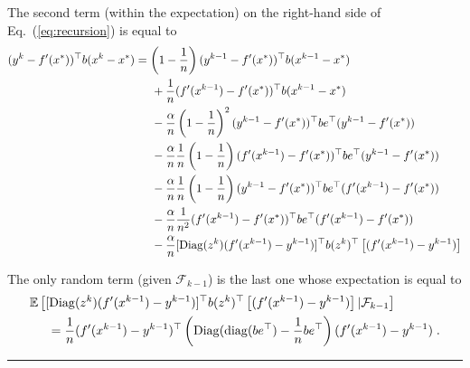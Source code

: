 \documentclass{article}
\newcommand{\diag}{\mathop{\rm diag}}
\newcommand{\Diag}{\mathop{\rm Diag}}
\newcommand{\BlackBox}{\rule{1.5ex}{1.5ex}}  %
\newenvironment{proof}{\par\noindent{\bf Proof\ }}{\hfill\BlackBox\\[2mm]}
\newcommand{\eq}[1]{Eq.~(\ref{eq:#1})}
\def\diag{\operatorname{diag}}
\def\E{_{\scriptscriptstyle E}}
\def \E{{\mathbb E}}
\def \E{{\mathbb E}}
\begin{document}
\begin{proof}
The second term (within the expectation) on the right-hand side of \eq{recursion} is equal to
\begin{align*}
(y^k - f'(x^\ast))^\top b (x^k - x^\ast) 	& = \left(1 - \frac{1}{n}\right)(y^{k-1} - f'(x^\ast))^\top b (x^{k-1} - x^\ast) \\
& \hspace*{.5cm} + \frac{1}{n}(f'(x^{k-1}) - f'(x^\ast))^\top b (x^{k-1} - x^\ast) \\
& \hspace*{.5cm} - \frac{\alpha}{n} \left(1 - \frac{1}{n}\right)^2(y^{k-1} - f'(x^\ast))^\top b e^\top (y^{k-1} - f'(x^\ast))\\
& \hspace*{.5cm} - \frac{\alpha}{n} \frac{1}{n} \left(1 - \frac{1}{n}\right)(f'(x^{k-1}) - f'(x^\ast))^\top b e^\top (y^{k-1} - f'(x^\ast))\\
& \hspace*{.5cm} - \frac{\alpha}{n} \frac{1}{n} \left(1 - \frac{1}{n}\right)(y^{k-1} - f'(x^\ast))^\top b e^\top (f'(x^{k-1}) - f'(x^\ast))\\
& \hspace*{.5cm} - \frac{\alpha}{n} \frac{1}{n^2} (f'(x^{k-1}) - f'(x^\ast))^\top b e^\top(f'(x^{k-1}) - f'(x^\ast))\\
& \hspace*{.5cm} - \frac{\alpha}{n} [\Diag(z^k) (f'(x^{k-1}) - y^{k-1})]^\top b (z^k)^\top \left[(f'(x^{k-1}) - y^{k-1})\right]
\end{align*}

The only random term (given $\mathcal{F}_{k-1}$) is the last one whose expectation is equal to
\begin{align*}
&\E\left[[\Diag(z^k) (f'(x^{k-1}) - y^{k-1})]^\top b (z^k)^\top \left[(f'(x^{k-1}) - y^{k-1})\right]| \mathcal{F}_{k-1}\right]\\
&\hspace*{.5cm} = \frac{1}{n}(f'(x^{k-1}) - y^{k-1})^\top \left(\Diag(\diag(be^\top) - \frac{1}{n}b e^\top\right)(f'(x^{k-1}) - y^{k-1}) \; .
\end{align*}


\end{proof}
\end{document}
